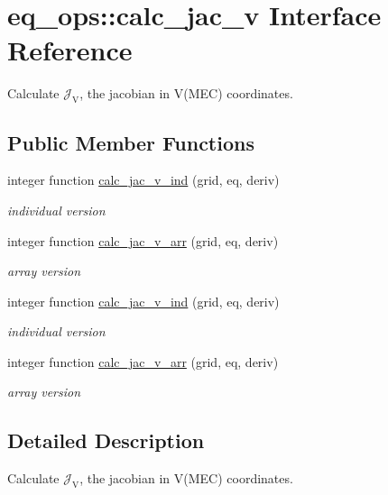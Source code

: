 \hypertarget{interfaceeq__ops_1_1calc__jac__v}{}\section{eq\+\_\+ops\+:\+:calc\+\_\+jac\+\_\+v Interface Reference}
\label{interfaceeq__ops_1_1calc__jac__v}


Calculate $\mathcal{J}_\text{V}$, the jacobian in V(\+M\+E\+C) coordinates.  


\subsection*{Public Member Functions}
\begin{DoxyCompactItemize}
\item 
integer function \hyperlink{interfaceeq__ops_1_1calc__jac__v_aee94f0bad510a7c93f9ae0d185dc4965}{calc\+\_\+jac\+\_\+v\+\_\+ind} (grid, eq, deriv)
\begin{DoxyCompactList}\small\item\em individual version \end{DoxyCompactList}\item 
integer function \hyperlink{interfaceeq__ops_1_1calc__jac__v_a93f9c07c6d225f6cbd200a100b14ccc8}{calc\+\_\+jac\+\_\+v\+\_\+arr} (grid, eq, deriv)
\begin{DoxyCompactList}\small\item\em array version \end{DoxyCompactList}\item 
integer function \hyperlink{interfaceeq__ops_1_1calc__jac__v_aee94f0bad510a7c93f9ae0d185dc4965}{calc\+\_\+jac\+\_\+v\+\_\+ind} (grid, eq, deriv)
\begin{DoxyCompactList}\small\item\em individual version \end{DoxyCompactList}\item 
integer function \hyperlink{interfaceeq__ops_1_1calc__jac__v_a93f9c07c6d225f6cbd200a100b14ccc8}{calc\+\_\+jac\+\_\+v\+\_\+arr} (grid, eq, deriv)
\begin{DoxyCompactList}\small\item\em array version \end{DoxyCompactList}\end{DoxyCompactItemize}


\subsection{Detailed Description}
Calculate $\mathcal{J}_\text{V}$, the jacobian in V(\+M\+E\+C) coordinates. 

